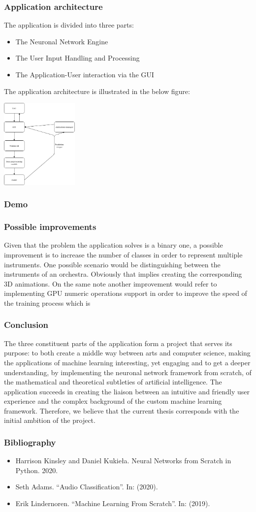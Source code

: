 \documentclass{beamer}
\begin{document}
\begin{frame}
\frametitle{Application architecture}
The application is divided into three parts:
\begin{itemize}
	\item The Neuronal Network Engine
	\item The User Input Handling and Processing
	\item The Application-User interaction via the GUI
\end{itemize}
The application architecture is illustrated in the below figure:
\begin{center}
	\centering
	\includegraphics[width = 1.5in]{images/fac.png}
	\centerline{}
	\label{uc1}
	\end{center}
\end{frame}
\begin{frame}
\frametitle{Demo}
\end{frame}

\begin{frame}
\frametitle{Possible improvements}
Given that the problem the application solves is a binary one, a possible improvement is
to increase the number of classes in order to represent multiple instruments.
One possible scenario would be distinguishing between the instruments of an orchestra.
Obviously that implies creating the corresponding 3D animations.
On the same note another improvement would refer to implementing GPU numeric
operations support in order to improve the speed of the training process which is
\end{frame}

\begin{frame}
\frametitle{Conclusion}
The three constituent parts of the application  form a project that serves its purpose:
to both create a middle way between arts and computer science, making the applications
of machine learning interesting, yet engaging and to get a deeper understanding, by
implementing the neuronal network framework from scratch, of the mathematical and theoretical
subtleties of artificial intelligence.
The application succeeds in creating the liaison between an intuitive and friendly
user experience and the complex background of the custom machine learning framework.
Therefore, we believe that the current thesis corresponds with the initial ambition of the project.
\end{frame}

\begin{frame}
\frametitle{Bibliography}
\begin{itemize}
	\item Harrison Kinsley and Daniel Kukieła. Neural Networks from Scratch in Python.
2020.
	\item Seth Adams. “Audio Classification”. In: (2020).

	\item Erik Lindernoren. “Machine Learning From Scratch”. In: (2019).

\end{itemize}
\end{frame}
\end{document}
